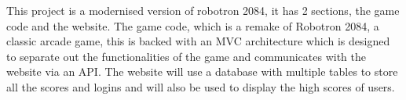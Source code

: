 This project is a modernised version of robotron 2084, it has 2 sections, the game code and the website. The game code, which is a remake of Robotron 2084, a classic arcade game, this is backed with an MVC architecture which is designed to separate out the functionalities of the game and communicates with the website via an API. The website will use a database with multiple tables to store all the scores and logins and will also be used to display the high scores of users.